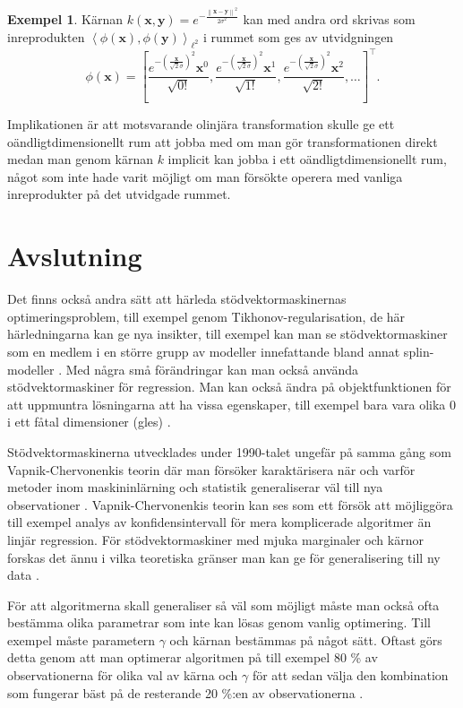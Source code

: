 \documentclass[a4paper, 12pt]{report}
\theoremstyle{definition}
\newtheorem{ex}{Exempel}[section]
\theoremstyle{remark}
\newcommand{\bfx}{\mathbf{x}}
\newcommand{\bfy}{\mathbf{y}}
\newcommand{\llangle}{\left\langle}
\newcommand{\rrangle}{\right\rangle}
\newcommand{\inner}[2]{\llangle #1, #2 \rrangle}
\begin{document}
\begin{ex}
	Kärnan $k\left(\bfx,\bfy\right)=e^{-\frac{\left\| \bfx-\bfy\right\|^2}{2\sigma^2}}$ kan med andra ord skrivas som inreprodukten $\inner{\phi\left(\bfx\right)}{\phi\left(\bfy\right)}_{\ell^2}$ i rummet som ges av utvidgningen
	\begin{equation*}
	\phi\left(\bfx\right)=\left[\frac{e^{-\left(\frac{\bfx}{\sqrt{2}\sigma}\right)^2} \bfx^0}{\sqrt{0!}}, \frac{e^{-\left(\frac{\bfx}{\sqrt{2}\sigma}\right)^2} \bfx^1}{\sqrt{1!}}, \frac{e^{-\left(\frac{\bfx}{\sqrt{2}\sigma}\right)^2} \bfx^2}{\sqrt{2!}},\dots\right]^\intercal.
	\end{equation*}
	
	Implikationen är att motsvarande olinjära transformation skulle ge ett oändligtdimensionellt rum att jobba med om man gör transformationen direkt medan man genom kärnan $k$ implicit kan jobba i ett oändligtdimensionellt rum, något som inte hade varit möjligt om man försökte operera med vanliga inreprodukter på det utvidgade rummet.
\end{ex}



\chapter{Avslutning}
Det finns också andra sätt att härleda stödvektormaskinernas optimeringsproblem, till exempel genom Tikhonov-regularisation, de här härledningarna kan ge nya insikter, till exempel kan man se stödvektormaskiner som en medlem i en större grupp av modeller innefattande bland annat splin-modeller \cite{ESL}. Med några små förändringar kan man också använda stödvektormaskiner för regression. Man kan också ändra på objektfunktionen för att uppmuntra lösningarna att ha vissa egenskaper, till exempel bara vara olika 0 i ett fåtal dimensioner (gles) \cite{LearningKernels}.

Stödvektormaskinerna utvecklades under 1990-talet ungefär på samma gång som Vapnik-Chervonenkis teorin där man försöker karaktärisera när och varför metoder inom maskininlärning och statistik generaliserar väl till nya observationer \cite{VC}. Vapnik-Chervonenkis teorin kan ses som ett försök att möjliggöra till exempel analys av konfidensintervall för mera komplicerade algoritmer än linjär regression. För stödvektormaskiner med mjuka marginaler och kärnor forskas det ännu i vilka teoretiska gränser man kan ge för generalisering till ny data \cite{theoretical}.

För att algoritmerna skall generaliser så väl som möjligt måste man också ofta bestämma olika parametrar som inte kan lösas genom vanlig optimering. Till exempel måste parametern $\gamma$ och kärnan bestämmas på något sätt. Oftast görs detta genom att man optimerar algoritmen på till exempel 80 \% av observationerna för olika val av kärna och $\gamma$ för att sedan välja den kombination som fungerar bäst på de resterande 20 \%:en av observationerna \cite{ESL}.
\end{document}

